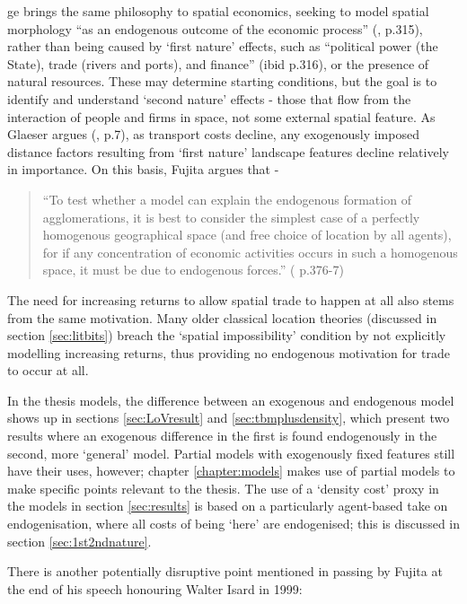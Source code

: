 \gls{ge} brings the same philosophy to spatial economics, seeking to model spatial morphology ``as an endogenous outcome of the economic process'' (\citealt{storper_agglomeration_2010}, p.315), rather than being caused by `first nature' effects, such as ``political power (the State), trade (rivers and ports), and finance'' (ibid p.316), or the presence of natural resources. These may determine starting conditions, but the goal is to identify and understand `second nature' effects - those that flow from the interaction of people and firms in space, not some external spatial feature. As Glaeser argues (\citealt{glaeser_cities_2004}, \citealt{glaeser_cities_2008} p.7), as transport costs decline, any exogenously imposed distance factors resulting from `first nature' landscape features decline relatively in importance. On this basis, Fujita argues that - 

\begin{quote}
``To test whether a model can explain the endogenous formation of agglomerations, it is best to consider the simplest case of a perfectly homogenous geographical space (and free choice of location by all agents), for if any concentration of economic activities occurs in such a homogenous space, it must be due to endogenous forces.'' (\citealt{fujita_location_1999} p.376-7)
\end{quote}

The need for increasing returns to allow spatial trade to happen at all also stems from the same motivation. Many older classical location theories (discussed in section \ref{sec:litbits}) breach the `spatial impossibility' condition by not explicitly modelling increasing returns, thus providing no endogenous motivation for trade to occur at all.

In the thesis models, the difference between an exogenous and endogenous model shows up in sections \ref{sec:LoVresult} and \ref{sec:tbmplusdensity}, which present two results where an exogenous difference in the first is found endogenously in the second, more `general' model. Partial models with exogenously fixed features still have their uses, however; chapter \ref{chapter:models} makes use of partial models to make specific points relevant to the thesis. The use of a `density cost' proxy in the models in section \ref{sec:results} is based on a particularly agent-based take on endogenisation, where all costs of being `here' are endogenised; this is discussed in section \ref{sec:1st2ndnature}. 

There is another potentially disruptive point mentioned in passing by Fujita at the end of his speech honouring Walter Isard in 1999:

